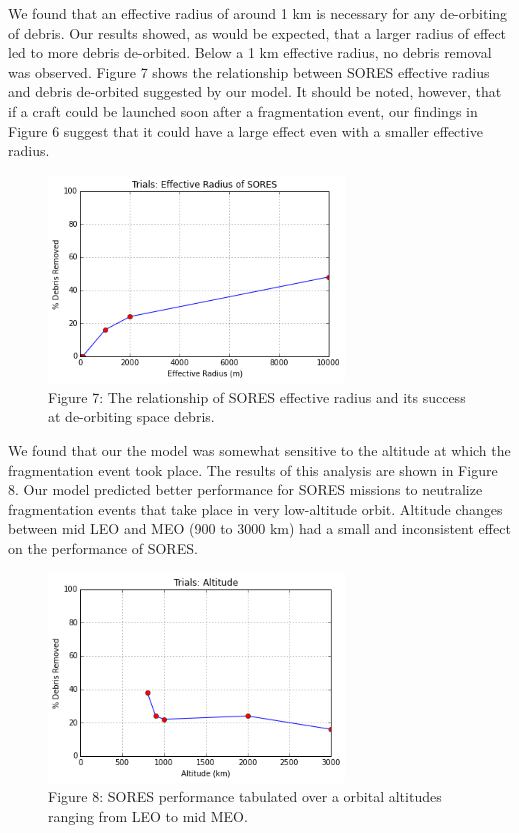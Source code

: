 \documentclass[12pt]{scrartcl}
\begin{document}
We found that an effective radius of around 1 km is necessary for any de-orbiting of debris. Our results showed, as would be expected, that a larger radius of effect led to more debris de-orbited. Below a 1 km effective radius, no debris removal was observed. Figure 7 shows the relationship between SORES effective radius and debris de-orbited suggested by our model. It should be noted, however, that if a craft could be launched soon after a fragmentation event, our findings in Figure 6 suggest that it could have a large effect even with a smaller effective radius.
\begin{figure}
\begin{center}
\label{fig:resultsvseffectiveradius}
\includegraphics[width=0.7\textwidth]{radius.png}\\
Figure 7: The relationship of SORES effective radius and its success at de-orbiting space debris.
\end{center}
\end{figure}

We found that our the  model was somewhat sensitive to the altitude at which the fragmentation event took place. The results of this analysis are shown in Figure 8. Our model predicted better performance for SORES missions to neutralize fragmentation events that take place in very low-altitude orbit. Altitude changes between mid LEO and MEO (900 to 3000 km) had a small and inconsistent effect on the performance of SORES.
    
\begin{figure}
\begin{center}
\label{fig:altitudesensitivity}
\includegraphics[width=0.7\textwidth]{altitude.png}\\
Figure 8: SORES performance tabulated over a orbital altitudes ranging from LEO to mid MEO.
\end{center}
\end{figure}
    
\end{document}
